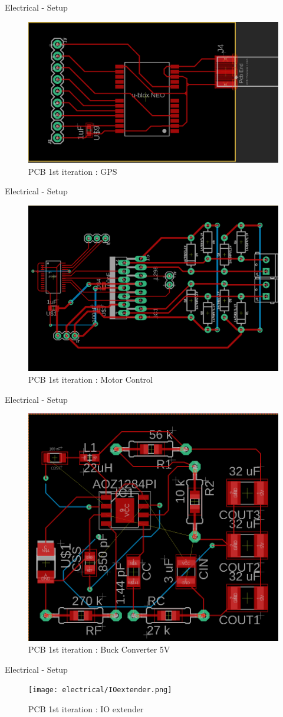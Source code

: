 \documentclass[11pt, aspectratio=169]{beamer}
\begin{document}
    \begin{frame}[c]{Electrical - Setup}
   		\begin{figure}[H]
            \includegraphics[width=.7\textwidth]{electrical/PCB_GPS.png}
           	\caption{PCB 1st iteration : GPS}
        \end{figure}
    \end{frame}
    
    
    \begin{frame}[c]{Electrical - Setup}
   		\begin{figure}[H]
            \includegraphics[width=.5\textwidth]{electrical/PCB_motorcontroll.png}
           	\caption{PCB 1st iteration : Motor Control}
        \end{figure}
    \end{frame}
    
    
    \begin{frame}[c]{Electrical - Setup}
   		\begin{figure}[H]
            \includegraphics[width=.4\textwidth]{electrical/PCB_buck5v.png}
           	\caption{PCB 1st iteration : Buck Converter 5V}
        \end{figure}
    \end{frame}
    
    
    \begin{frame}[c]{Electrical - Setup}
   		\begin{figure}[H]
            \texttt{[image: electrical/IOextender.png]}
           	\caption{PCB 1st iteration : IO extender}
        \end{figure}
    \end{frame}
    
\end{document}

